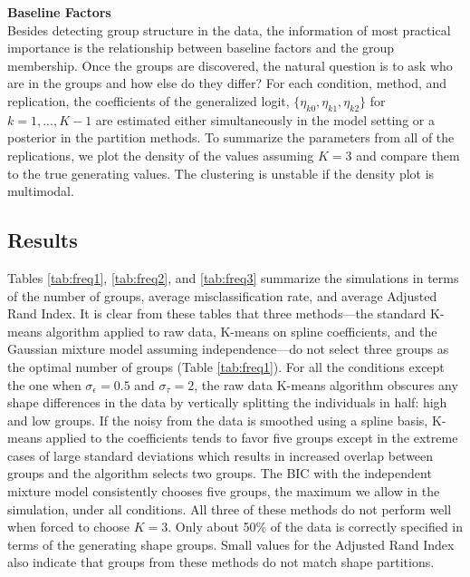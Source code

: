 \documentclass[12pt]{article}
\begin{document}
\textbf{Baseline Factors}\\
Besides detecting group structure in the data, the information of most practical importance is the relationship between baseline factors and the group membership. Once the groups are discovered, the natural question is to ask who are in the groups and how else do they differ? For each condition, method, and replication, the coefficients of the generalized logit, $\{\eta_{k0},\eta_{k1},\eta_{k2}\}$ for $k=1,...,K-1$ are estimated either simultaneously in the model setting or a posterior in the partition methods. To summarize the parameters from all of the replications, we plot the density of the values assuming $K=3$ and compare them to the true generating values. The clustering is unstable if the density plot is multimodal.

\subsection{Results}
Tables \ref{tab:freq1}, \ref{tab:freq2}, and \ref{tab:freq3} summarize the simulations in terms of the number of groups, average misclassification rate, and average Adjusted Rand Index. It is clear from these tables that three methods---the standard K-means algorithm applied to raw data, K-means on spline coefficients, and the Gaussian mixture model assuming independence---do not select three groups as the optimal number of groups (Table \ref{tab:freq1}). For all the conditions except the one when $\sigma_{\epsilon}=0.5$ and $\sigma_{\tau}=2$, the raw data K-means algorithm obscures any shape differences in the data by vertically splitting the individuals in half: high and low groups. If the noisy from the data is smoothed using a spline basis, K-means applied to the coefficients tends to favor five groups except in the extreme cases of large standard deviations which results in increased overlap between groups and the algorithm selects two groups. The BIC with the independent mixture model consistently chooses five groups, the maximum we allow in the simulation, under all conditions. All three of these methods do not perform well when forced to choose $K=3$. Only about 50\% of the data is correctly specified in terms of the generating shape groups. Small values for the Adjusted Rand Index also indicate that groups from these methods do not match shape partitions.\\
\end{document}
